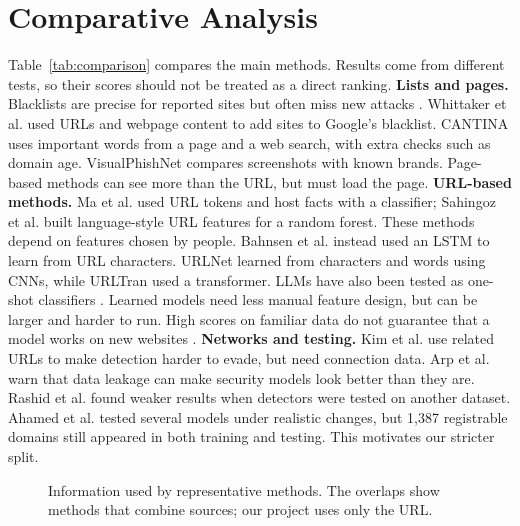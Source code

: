 \documentclass[sigconf,nonacm]{acmart}
\begin{document}
\section{Comparative Analysis}
Table~\ref{tab:comparison} compares the main methods. Results come from different tests, so their scores should not be treated as a direct ranking.
\textbf{Lists and pages.} Blacklists are precise for reported sites but often miss new attacks \cite{sheng}. Whittaker et al. \cite{whittaker} used URLs and webpage content to add sites to Google's blacklist. CANTINA \cite{cantina} uses important words from a page and a web search, with extra checks such as domain age. VisualPhishNet \cite{visual} compares screenshots with known brands. Page-based methods can see more than the URL, but must load the page.
\textbf{URL-based methods.} Ma et al. \cite{ma} used URL tokens and host facts with a classifier; Sahingoz et al. \cite{sahingoz} built language-style URL features for a random forest. These methods depend on features chosen by people. Bahnsen et al. \cite{bahnsen} instead used an LSTM to learn from URL characters. URLNet \cite{urlnet} learned from characters and words using CNNs, while URLTran \cite{urltran} used a transformer. LLMs have also been tested as one-shot classifiers \cite{llm}. Learned models need less manual feature design, but can be larger and harder to run. High scores on familiar data do not guarantee that a model works on new websites \cite{ahamed}.
\textbf{Networks and testing.} Kim et al. \cite{kim} use related URLs to make detection harder to evade, but need connection data. Arp et al. \cite{arp} warn that data leakage can make security models look better than they are. Rashid et al. \cite{rashid} found weaker results when detectors were tested on another dataset. Ahamed et al. \cite{ahamed} tested several models under realistic changes, but 1,387 registrable domains still appeared in both training and testing. This motivates our stricter split.
\begin{figure}[t]
\centering
{}
\caption{Information used by representative methods. The overlaps show methods that combine sources; our project uses only the URL.}\label{fig:venn}
\end{figure}
\end{document}
